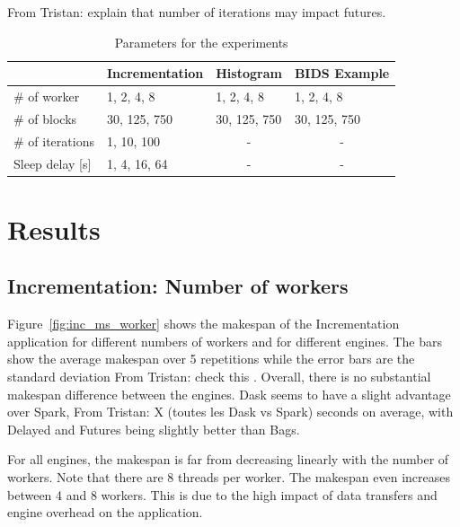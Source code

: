 \documentclass[conference]{IEEEtran}
\newcommand{\TG}[1]{\color{cyan}From Tristan: #1 \color{black}}
\begin{document}
\TG{explain that number of iterations may impact futures.}


\begin{table}[!t]
    \renewcommand{\arraystretch}{1.3}
    \caption{Parameters for the experiments}\label{tab:param}
    \centering
    \begin{tabular*}{\columnwidth}{llll}
    \hline
                        & Incrementation & Histogram             & BIDS Example          \\ \hline
    \# of worker        & 1, 2, 4, 8     & 1, 2, 4, 8            & 1, 2, 4, 8            \\
    \# of blocks        & 30, 125, 750   & 30, 125, 750          & 30, 125, 750          \\
    \# of iterations    & 1, 10, 100     & \multicolumn{1}{c}{-} & \multicolumn{1}{c}{-} \\
    Sleep delay {[}s{]} & 1, 4, 16, 64   & \multicolumn{1}{c}{-} & \multicolumn{1}{c}{-} \\ \hline
    \end{tabular*}
    \end{table}






\section{Results}

\subsection{Incrementation: Number of workers}
Figure~\ref{fig:inc_ms_worker} shows the makespan of the Incrementation
application for different numbers of workers and for different engines. 
The bars show the average makespan over 5 repetitions while the error bars 
are the standard deviation \TG{check this}.
Overall, there is no substantial makespan difference between the engines.
Dask seems to have a slight advantage over Spark, \TG{X (toutes les Dask vs Spark)} seconds on
average, with Delayed and Futures being slightly better than Bags.

For all engines, the makespan is far from decreasing linearly with the
number of workers. Note that there are 8 threads per worker. The makespan
even increases between 4 and 8 workers. This is due to the high impact of
data transfers and engine overhead on the application. 
\end{document}
